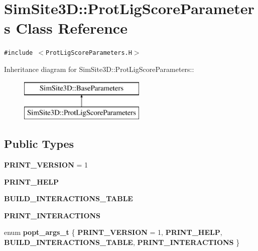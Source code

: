 \section{SimSite3D::Prot\-Lig\-Score\-Parameters Class Reference}
\label{classSimSite3D_1_1ProtLigScoreParameters}
{\tt \#include $<$Prot\-Lig\-Score\-Parameters.H$>$}

Inheritance diagram for SimSite3D::Prot\-Lig\-Score\-Parameters::\begin{figure}[H]
\begin{center}
\leavevmode
\includegraphics[height=2cm]{classSimSite3D_1_1ProtLigScoreParameters}
\end{center}
\end{figure}
\subsection*{Public Types}
\begin{CompactItemize}
\item 
\textbf{PRINT\_\-VERSION} = 1\label{classSimSite3D_1_1ProtLigScoreParameters_b7a9a2b023394c378461bd68df038bd29305d63d54f96f7ee778ef05392a7dab}

\item 
\textbf{PRINT\_\-HELP}\label{classSimSite3D_1_1ProtLigScoreParameters_b7a9a2b023394c378461bd68df038bd21075878cd4751c0b277fd4bc7d447435}

\item 
\textbf{BUILD\_\-INTERACTIONS\_\-TABLE}\label{classSimSite3D_1_1ProtLigScoreParameters_b7a9a2b023394c378461bd68df038bd291556765acaf9b14a740324aa7f42dcc}

\item 
\textbf{PRINT\_\-INTERACTIONS}\label{classSimSite3D_1_1ProtLigScoreParameters_b7a9a2b023394c378461bd68df038bd2fe1c72651287d18338539baf44f75cc8}

\item 
enum \textbf{popt\_\-args\_\-t} \{ \textbf{PRINT\_\-VERSION} =  1, 
\textbf{PRINT\_\-HELP}, 
\textbf{BUILD\_\-INTERACTIONS\_\-TABLE}, 
\textbf{PRINT\_\-INTERACTIONS}
 \}
\end{CompactItemize}
